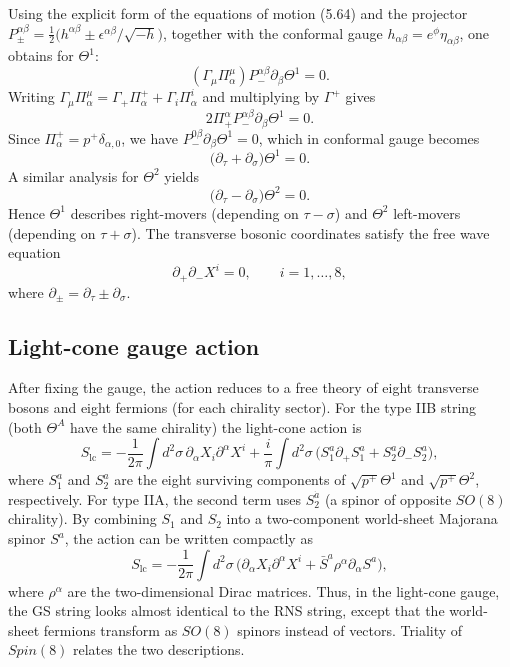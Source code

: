 \documentclass[12pt]{article}
\begin{document}
Using the explicit form of the equations of motion (5.64) and the projector $P_{\pm}^{\alpha\beta}=\frac{1}{2}\bigl(h^{\alpha\beta}\pm\epsilon^{\alpha\beta}/\sqrt{-h}\bigr)$, together with the conformal gauge $h_{\alpha\beta}=e^{\phi}\eta_{\alpha\beta}$, one obtains for $\Theta^{1}$:
\[
(\Gamma_{\mu}\Pi_{\alpha}^{\mu})P_{-}^{\alpha\beta}\partial_{\beta}\Theta^{1}=0.
\]
Writing $\Gamma_{\mu}\Pi_{\alpha}^{\mu}=\Gamma_{+}\Pi_{\alpha}^{+}+\Gamma_{i}\Pi_{\alpha}^{i}$ and multiplying by $\Gamma^{+}$ gives
\[
2\Pi_{+}^{\alpha}P_{-}^{\alpha\beta}\partial_{\beta}\Theta^{1}=0.
\]
Since $\Pi_{\alpha}^{+}=p^{+}\delta_{\alpha,0}$, we have $P_{-}^{0\beta}\partial_{\beta}\Theta^{1}=0$, which in conformal gauge becomes
\[
\bigl(\partial_{\tau}+\partial_{\sigma}\bigr)\Theta^{1}=0.
\]
A similar analysis for $\Theta^{2}$ yields
\[
\bigl(\partial_{\tau}-\partial_{\sigma}\bigr)\Theta^{2}=0.
\]
Hence $\Theta^{1}$ describes right-movers (depending on $\tau-\sigma$) and $\Theta^{2}$ left-movers (depending on $\tau+\sigma$). The transverse bosonic coordinates satisfy the free wave equation
\[
\partial_{+}\partial_{-}X^{i}=0,\qquad i=1,\dots,8,
\]
where $\partial_{\pm}=\partial_{\tau}\pm\partial_{\sigma}$.

\subsection{Light-cone gauge action}

After fixing the gauge, the action reduces to a free theory of eight transverse bosons and eight fermions (for each chirality sector). For the type IIB string (both $\Theta^{A}$ have the same chirality) the light-cone action is
\[
S_{\text{lc}}=-\frac{1}{2\pi}\int d^{2}\sigma\,\partial_{\alpha}X_{i}\partial^{\alpha}X^{i}+\frac{i}{\pi}\int d^{2}\sigma\,\bigl(S_{1}^{a}\partial_{+}S_{1}^{a}+S_{2}^{a}\partial_{-}S_{2}^{a}\bigr),
\]
where $S_{1}^{a}$ and $S_{2}^{a}$ are the eight surviving components of $\sqrt{p^{+}}\Theta^{1}$ and $\sqrt{p^{+}}\Theta^{2}$, respectively. For type IIA, the second term uses $S_{2}^{\dot{a}}$ (a spinor of opposite $SO(8)$ chirality). By combining $S_{1}$ and $S_{2}$ into a two-component world-sheet Majorana spinor $S^{a}$, the action can be written compactly as
\[
S_{\text{lc}}=-\frac{1}{2\pi}\int d^{2}\sigma\,\bigl(\partial_{\alpha}X_{i}\partial^{\alpha}X^{i}+\bar{S}^{a}\rho^{\alpha}\partial_{\alpha}S^{a}\bigr),
\]
where $\rho^{\alpha}$ are the two-dimensional Dirac matrices. Thus, in the light-cone gauge, the GS string looks almost identical to the RNS string, except that the world-sheet fermions transform as $SO(8)$ spinors instead of vectors. Triality of $Spin(8)$ relates the two descriptions.
\end{document}
